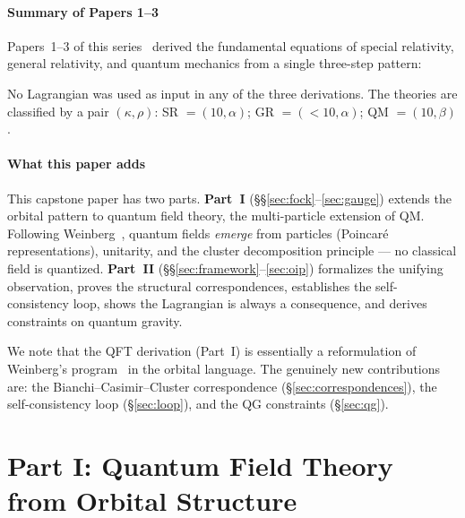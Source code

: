 \documentclass[12pt]{article}
\theoremstyle{plain}
\theoremstyle{definition}
\theoremstyle{remark}
\begin{document}
\subsection{Summary of Papers 1--3}

Papers~1--3 of this series~\cite{nembe2026p1,nembe2026p2,nembe2026p3a} derived the fundamental equations of special relativity, general relativity, and quantum mechanics from a single three-step pattern:
\begin{center}
\end{center}
No Lagrangian was used as input in any of the three derivations. The theories are classified by a pair $(\kappa, \rho)$: SR $= (10, \alpha)$; GR $= (<\!10, \alpha)$; QM $= (10, \beta)$.

\subsection{What this paper adds}

This capstone paper has two parts. \textbf{Part~I} (\S\S\ref{sec:fock}--\ref{sec:gauge}) extends the orbital pattern to quantum field theory, the multi-particle extension of QM. Following Weinberg~\cite{weinberg1995}, quantum fields \emph{emerge} from particles (Poincar\'e representations), unitarity, and the cluster decomposition principle --- no classical field is quantized. \textbf{Part~II} (\S\S\ref{sec:framework}--\ref{sec:oip}) formalizes the unifying observation, proves the structural correspondences, establishes the self-consistency loop, shows the Lagrangian is always a consequence, and derives constraints on quantum gravity.

We note that the QFT derivation (Part~I) is essentially a reformulation of Weinberg's program~\cite{weinberg1995} in the orbital language. The genuinely new contributions are: the Bianchi--Casimir--Cluster correspondence (\S\ref{sec:correspondences}), the self-consistency loop (\S\ref{sec:loop}), and the QG constraints (\S\ref{sec:qg}).



\part*{Part I: Quantum Field Theory from Orbital Structure}
\end{document}
